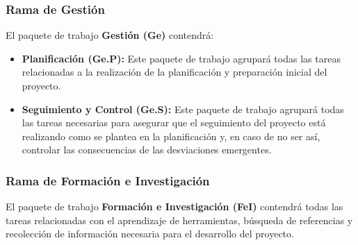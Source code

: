 \subsubsection{Rama de Gestión}
El paquete de trabajo \textbf{Gestión (Ge)} contendrá:
\begin{itemize}
    \item \textbf{Planificación (Ge.P):} Este paquete de trabajo agrupará todas
    las tareas relacionadas a la realización de la planificación y preparación
    inicial del proyecto.
    \item \textbf{Seguimiento y Control (Ge.S):} Este paquete de trabajo agrupará
    todas las tareas necesarias para asegurar que el seguimiento del proyecto
    está realizando como se plantea en la planificación y, en caso de no ser
    así, controlar las consecuencias de las desviaciones emergentes.
\end{itemize}

\subsubsection{Rama de Formación e Investigación}
El paquete de trabajo \textbf{Formación e Investigación (FeI)} contendrá todas
las tareas relacionadas con el aprendizaje de herramientas, búsqueda de
referencias y recolección de información necesaria para el desarrollo del
proyecto.

